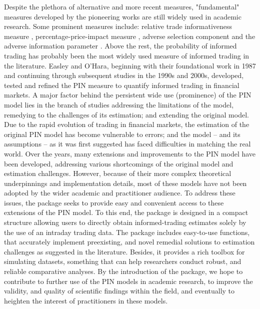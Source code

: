 Despite the plethora of alternative and more recent measures, "fundamental" measures developed by the pioneering works are still widely used in academic research. Some prominent measures include: relative trade informativeness measure \citep{Hasbrouck1991Measuring}, percentage-price-impact measure \citep{Huang1996Dealer}, adverse selection component \citep{Huang1997components} and the adverse information parameter \citep{Madhavan1997Why}. Above the rest, the probability of informed trading \citep[PIN;][]{easley1992time, easley1996liquidity} has probably been the most widely used measure of informed trading in the literature. Easley and O'Hara, beginning with their foundational work in 1987 and continuing through subsequent studies in the 1990s and 2000s, developed, tested and refined the PIN measure to quantify informed trading in financial markets.
A major factor behind the persistent wide use (prominence) of the PIN model lies in the branch of studies addressing the limitations of the model, remedying to the challenges of its estimation; and extending the original model. Due to the rapid evolution of trading in financial markets, the estimation of the original PIN model has become vulnerable to errors; and the model – and its assumptions – as it was first suggested has faced difficulties in matching the real world. 
Over the years, many extensions and improvements to the PIN model have been developed, addressing various shortcomings of the original model and estimation challenges. However, because of their more complex theoretical underpinnings and implementation details, most of these models have not been adopted by the wider academic and practitioner audience. To address these issues, the  package seeks to provide easy and convenient access to these extensions of the PIN model. To this end, the package is designed in a compact structure allowing users to directly obtain informed-trading estimates solely by the use of an intraday trading data. The package includes easy-to-use functions, that accurately implement preexisting, and novel remedial solutions to estimation challenges as suggested in the literature. Besides, it provides a rich toolbox for simulating datasets, something that can help researchers conduct robust, and reliable comparative analyses. By the introduction of the package, we hope to contribute to further use of the PIN models in academic research, to improve the validity, and quality of scientific findings within the field, and eventually to heighten the interest of practitioners in these models. 

